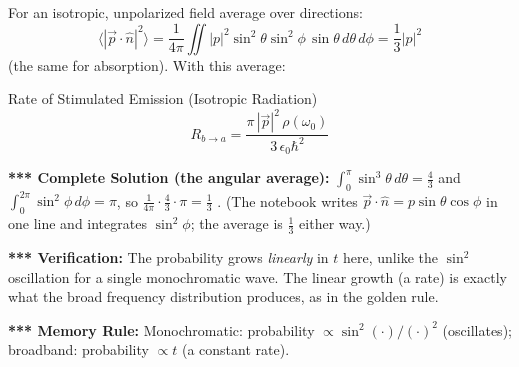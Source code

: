 \documentclass[11pt,a4paper]{article}
\begin{document}
\begin{center}
\end{center}

For an isotropic, unpolarized field average over directions:
\[
\big\langle|\vec p\cdot\hat n|^2\big\rangle=\frac1{4\pi}\iint|p|^2\sin^2\theta\sin^2\phi\,\sin\theta\,d\theta\,d\phi=\frac13|p|^2
\]
(the same for absorption). With this average:
\begin{thm}{Rate of Stimulated Emission (Isotropic Radiation)}
\[
R_{b\to a}=\frac{\pi\,|\vec p|^2\,\rho(\omega_0)}{3\,\epsilon_0\hbar^2}
\]
\end{thm}

\textbf{*** Complete Solution (the angular average):} $\int_0^\pi\sin^3\theta\,d\theta=\tfrac43$ and $\int_0^{2\pi}\sin^2\phi\,d\phi=\pi$, so $\frac1{4\pi}\cdot\frac43\cdot\pi=\frac13$ \checkmark. (The notebook writes $\vec p\cdot\hat n=p\sin\theta\cos\phi$ in one line and integrates $\sin^2\phi$; the average is $\tfrac13$ either way.)

\textbf{*** Verification:} The probability grows \textit{linearly} in $t$ here, unlike the $\sin^2$ oscillation for a single monochromatic wave. The linear growth (a rate) is exactly what the broad frequency distribution produces, as in the golden rule.

\textbf{*** Memory Rule:} Monochromatic: probability $\propto\sin^2(\cdot)/(\cdot)^2$ (oscillates); broadband: probability $\propto t$ (a constant rate).
\end{document}

